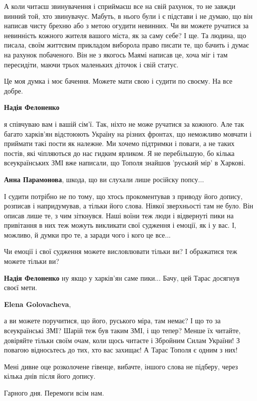 \begin{itemize}
\begin{itemize}
А коли читаєш звинувачення і сприймаєш все на свій рахунок, то не завжди винний
той, хто звинувачує. Мабуть, в нього були і є підстави і не думаю, що він
написав чисту брехню або з метою огудити невинних. Чи ви можете ручатися за
невинність кожного жителя вашого міста, як за саму себе? І ще. Та людина, що
писала, своїм життєвим прикладом виборола право писати те, що бачить і думає на
рахунок побаченого. Він не з якогось Маямі написав це, хоча міг і там
пересидіти, маючи трьох маленьких діточок і свій статус.

Це моя думка і моє бачення. Можете мати свою і судити по своєму. На все добре.

\textbf{Надія Фелоненко} 

я співчуваю вам і вашій сім'ї. Так, ніхто не може ручатися за кожного. Але так
багато харків'ян відстоюють Україну на різних фронтах, що неможливо мовчати і
приймати такі пости як належне. Ми хочемо підтримки і поваги, а не таких
постів, які чіпляються до нас гидким ярликом. Я не перебільшую, бо кілька
всеукраїнських ЗМІ вже написали, що Тополя знайшов 'руський мір' в Харкові.

\textbf{Анна Парамонова}, шкода, що ви слухали лише російску попсу...

І судити потрібно не по тому, що хтось прокоментував з приводу його допису,
розписав і напридумував, а тільки його слова. Ніякої зверхньості там не було.
Він описав лише те, з чим зіткнувся. Наші воїни теж люди і відвернуті пики на
привітання в них теж можуть викликати свої судження і емоції, як і у вас. І,
можливо, й думки про те, а заради чого і кого це все...

Чи емоції і свої судження можете висловлювати тільки ви? І ображатися теж
можете тільки ви?

\textbf{Надія Фелоненко} ну якщо у харків'ян саме пики... Бачу, цей Тарас досягнув своєї мети.

\textbf{Elena Golovacheva}, 

а ви можете поручитися, що його, руського міра, там немає? І що то за
всеукраїнські ЗМІ? Шарій теж був таким ЗМІ, і що тепер? Менше їх читайте,
довіряйте тільки своїм очам, коли щось читаєте і Збройним Силам України! З
повагою відносьтесь до тих, хто вас захищає! А Тарас Тополя є одним з них!

Мені дивне оце розколочене гівенце, вибачте, іншого слова не підберу, через
кілька днів після його допису.

Гарного дня. Перемоги всім нам.


\end{itemize}
\end{itemize}
